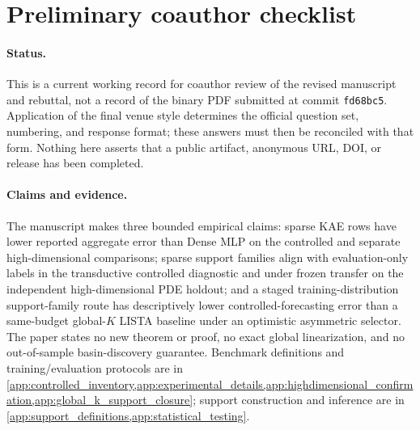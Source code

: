 \clearpage
\section{Preliminary coauthor checklist}
\label{app:checklist_details}
\begingroup
\sloppy
\paragraph{Status.}
This is a current working record for coauthor review of the revised manuscript
and rebuttal, not a record of the binary PDF submitted at commit
\texttt{fd68bc5}. Application of the final venue style determines the official
question set, numbering, and response format; these answers must then be
reconciled with that form. Nothing here asserts that a public artifact,
anonymous URL, DOI, or release has been completed.
\paragraph{Claims and evidence.}
The manuscript makes three bounded empirical claims: sparse KAE rows have
lower reported aggregate error than Dense MLP on the controlled and separate
high-dimensional comparisons; sparse support
families align with evaluation-only labels in the transductive controlled
diagnostic and under frozen transfer on the independent high-dimensional PDE
holdout; and a
staged training-distribution support-family route has descriptively lower
controlled-forecasting error than a same-budget global-\(K\) LISTA baseline
under an optimistic asymmetric selector.  The paper states no new theorem
or proof, no exact global linearization, and no out-of-sample basin-discovery
guarantee.  Benchmark definitions and training/evaluation protocols are in
\cref{app:controlled_inventory,app:experimental_details,app:highdimensional_confirmation,app:global_k_support_closure};
support construction and inference are in
\cref{app:support_definitions,app:statistical_testing}.
